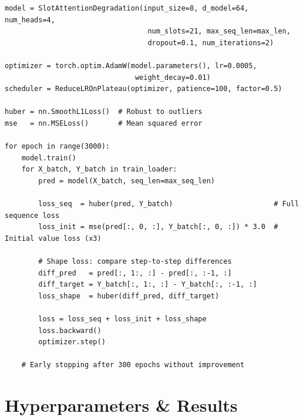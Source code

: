 \documentclass[11pt,a4paper]{article}
\begin{document}
\begin{lstlisting}
model = SlotAttentionDegradation(input_size=8, d_model=64, num_heads=4,
                                  num_slots=21, max_seq_len=max_len,
                                  dropout=0.1, num_iterations=2)

optimizer = torch.optim.AdamW(model.parameters(), lr=0.0005,
                               weight_decay=0.01)
scheduler = ReduceLROnPlateau(optimizer, patience=100, factor=0.5)

huber = nn.SmoothL1Loss()  # Robust to outliers
mse   = nn.MSELoss()       # Mean squared error

for epoch in range(3000):
    model.train()
    for X_batch, Y_batch in train_loader:
        pred = model(X_batch, seq_len=max_seq_len)

        loss_seq  = huber(pred, Y_batch)                        # Full sequence loss
        loss_init = mse(pred[:, 0, :], Y_batch[:, 0, :]) * 3.0  # Initial value loss (x3)

        # Shape loss: compare step-to-step differences
        diff_pred   = pred[:, 1:, :] - pred[:, :-1, :]
        diff_target = Y_batch[:, 1:, :] - Y_batch[:, :-1, :]
        loss_shape  = huber(diff_pred, diff_target)

        loss = loss_seq + loss_init + loss_shape
        loss.backward()
        optimizer.step()

    # Early stopping after 300 epochs without improvement
\end{lstlisting}

\section{Hyperparameters \& Results}
\end{document}
